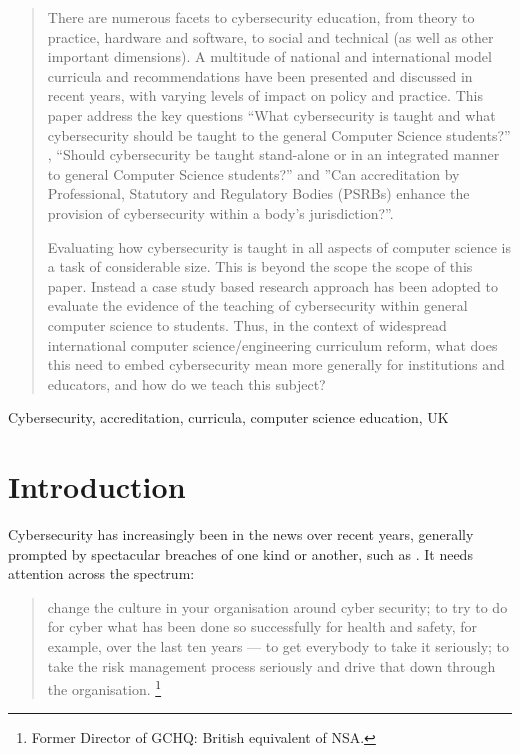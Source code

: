 \documentclass[conference]{IEEEtran}
\begin{document}
\begin{abstract}
There are numerous facets to cybersecurity education, from theory to practice, hardware and software, to social and technical (as well as other important dimensions). A multitude of national and international model curricula and recommendations 
have been presented and discussed in recent years, with varying levels of impact on policy and practice. This paper address the key questions ``What cybersecurity is taught and what cybersecurity should be taught to the general Computer Science students?'' , ``Should cybersecurity be taught stand-alone or in an integrated manner to general Computer Science students?'' and ''Can accreditation by Professional, Statutory and Regulatory Bodies (PSRBs) enhance the provision of cybersecurity within a body's jurisdiction?''. 

Evaluating how cybersecurity is taught in all aspects of computer science is a  task of considerable size. This is beyond the scope the scope of this paper. Instead a case study based research approach has been adopted to evaluate the evidence of the teaching of cybersecurity within general computer science to students. Thus, in the context of widespread international computer science/engineering curriculum reform, %
what does this need to embed cybersecurity mean more generally for institutions and educators, and how do we teach this subject?

\end{abstract}

\begin{IEEEkeywords}
Cybersecurity, accreditation, curricula, computer science education, UK
\end{IEEEkeywords}


\section{Introduction}

Cybersecurity has increasingly been in the news over recent years, generally prompted by spectacular breaches of one kind or another, such as \cite{BritishAirways2018a}.
It needs attention across the spectrum:
\begin{quote}
change the culture in your organisation around cyber security; to try to do for cyber what has been done so successfully for health and safety, for example, over the last ten years --- to get everybody to take it seriously; to take the risk management process seriously and drive that down through the organisation. \cite{Hannigan2019a}\footnote{Former Director of GCHQ: British equivalent of NSA.}
\end{quote}
\end{document}

